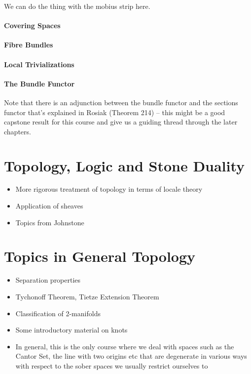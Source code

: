 \documentclass[oneside,english]{amsbook}
\numberwithin{section}{chapter}
\theoremstyle{plain}
\theoremstyle{definition}
\begin{document}
We can do the thing with the mobius strip here.


\subsection{Covering Spaces}

\subsection{Fibre Bundles}

\subsection{Local Trivializations}

\subsection{The Bundle Functor}

Note that there is an adjunction between the bundle functor and the sections functor that's explained in Rosiak (Theorem 214) -- this might be a good capstone result for this course and give us a guiding thread through the later chapters. 





\part{Topology, Logic and Stone Duality}
\begin{itemize}
	\item{More rigorous treatment of topology in terms of locale theory}
	\item{Application of sheaves}
	\item{Topics from Johnstone}
\end{itemize}

\part{Topics in General Topology}

\begin{itemize}
	\item{Separation properties}
	\item{Tychonoff Theorem, Tietze Extension Theorem}
	\item{Classification of 2-manifolds}
	\item{Some introductory material on knots}
	\item{In general, this is the only course where we deal with spaces such as the Cantor Set, the line with two origins etc that are degenerate in various ways with respect to the sober spaces we usually restrict ourselves to}
\end{itemize}
\end{document}
